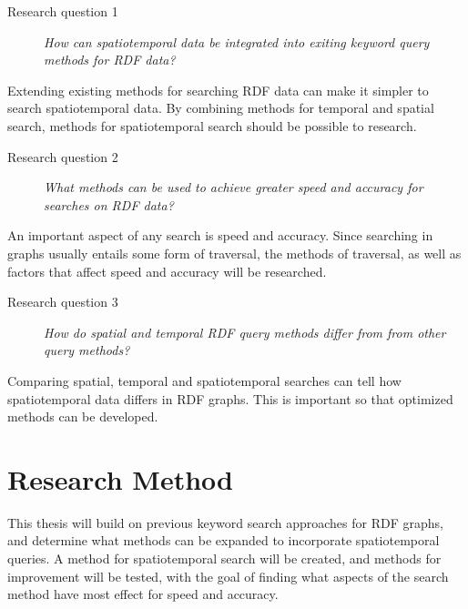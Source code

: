 \begin{description}
    \item[Research question 1] {\em How can spatiotemporal data be integrated into exiting keyword query methods for RDF data?}
\end{description}

Extending existing methods for searching RDF data can make it simpler to search spatiotemporal data. By combining methods for temporal and spatial search, methods for spatiotemporal search should be possible to research.

\begin{description}
    \item[Research question 2] {\em What methods can be used to achieve greater speed and accuracy for searches on RDF data?}
\end{description}

An important aspect of any search is speed and accuracy. Since searching in graphs usually entails some form of traversal, the methods of traversal, as well as factors that affect speed and accuracy will be researched.

\begin{description}
    \item[Research question 3] {\em How do spatial and temporal RDF query methods differ from from other query methods?}
\end{description}

Comparing spatial, temporal and spatiotemporal searches can tell how spatiotemporal data differs in RDF graphs. This is important so that optimized methods can be developed.

\section{Research Method}
\label{sec:researchMethod}
This thesis will build on previous keyword search approaches for RDF graphs, and determine what methods can be expanded to incorporate spatiotemporal queries. A method for spatiotemporal search will be created, and methods for improvement will be tested, with the goal of finding what aspects of the search method have most effect for speed and accuracy.

\glsresetall